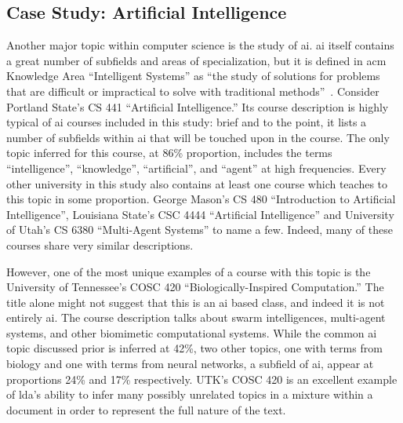 
\subsection{Case Study: Artificial Intelligence}
\label{sec:eval-topics-ai}


Another major topic within computer science is the study of \ac{ai}.
\ac{ai} itself contains a great number of subfields and areas of specialization, but it is defined in \ac{acm} Knowledge Area ``Intelligent Systems'' as ``the study of solutions for problems that are difficult or impractical to solve with traditional methods''~\cite{CS2013}.
Consider Portland State's CS 441 ``Artificial Intelligence.''
Its course description is highly typical of \ac{ai} courses included in this study: brief and to the point, it lists a number of subfields within \ac{ai} that will be touched upon in the course.
The only topic inferred for this course, at 86\% proportion, includes the terms ``intelligence'', ``knowledge'', ``artificial'', and ``agent'' at high frequencies.
Every other university in this study also contains at least one course which teaches to this topic in some proportion.
George Mason's CS 480 ``Introduction to Artificial Intelligence'', Louisiana State's CSC 4444 ``Artificial Intelligence'' and University of Utah's CS 6380 ``Multi-Agent Systems'' to name a few.
Indeed, many of these courses share very similar descriptions.


However, one of the most unique examples of a course with this topic is the University of Tennessee's COSC 420 ``Biologically-Inspired Computation.''
The title alone might not suggest that this is an \ac{ai} based class, and indeed it is not entirely \ac{ai}.
The course description talks about swarm intelligences, multi-agent systems, and other biomimetic computational systems.
While the common \ac{ai} topic discussed prior is inferred at 42\%, two other topics, one with terms from biology and one with terms from neural networks, a subfield of \ac{ai}, appear at proportions 24\% and 17\% respectively.
UTK's COSC 420 is an excellent example of \ac{lda}'s ability to infer many possibly unrelated topics in a mixture within a document in order to represent the full nature of the text.


